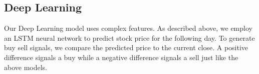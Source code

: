 \documentclass[../thesis.tex]{subfiles}
\begin{document}
\subsection{Deep Learning}

Our Deep Learning model uses complex features. As described above, we employ an LSTM neural network to predict stock price for the following day. To generate buy sell signals, we compare the predicted price to the current close. A positive difference signals a buy while a negative difference signals a sell just like the above models. 
\end{document}
